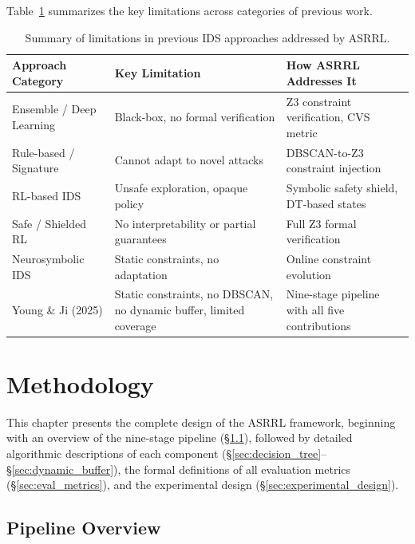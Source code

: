 \documentclass[12pt, letterpaper, oneside]{report}
\newcommand{\ASRRL}{\textsc{ASRRL}}
\begin{document}
Table~\ref{tab:prior_limitations} summarizes the key limitations across categories of previous work.

\begin{table}[htbp]
\centering
\caption{Summary of limitations in previous IDS approaches addressed by \ASRRL{}.}
\label{tab:prior_limitations}
\small
\begin{tabular}{p{3.5cm}p{4cm}p{4cm}}
\toprule
\textbf{Approach Category} & \textbf{Key Limitation} & \textbf{How \ASRRL{} Addresses It} \\
\midrule
Ensemble / Deep Learning & Black-box, no formal verification & Z3 constraint verification, CVS metric \\
Rule-based / Signature & Cannot adapt to novel attacks & DBSCAN-to-Z3 constraint injection \\
RL-based IDS & Unsafe exploration, opaque policy & Symbolic safety shield, DT-based states \\
Safe / Shielded RL & No interpretability or partial guarantees & Full Z3 formal verification \\
Neurosymbolic IDS & Static constraints, no adaptation & Online constraint evolution \\
Young \& Ji (2025) & Static constraints, no DBSCAN, no dynamic buffer, limited coverage & Nine-stage pipeline with all five contributions \\
\bottomrule
\end{tabular}
\end{table}



\chapter{Methodology}
\label{ch:methodology}

This chapter presents the complete design of the \ASRRL{} framework, beginning with an overview of the nine-stage pipeline (\S\ref{sec:pipeline_overview}), followed by detailed algorithmic descriptions of each component (\S\ref{sec:decision_tree}--\S\ref{sec:dynamic_buffer}), the formal definitions of all evaluation metrics (\S\ref{sec:eval_metrics}), and the experimental design (\S\ref{sec:experimental_design}).


\section{Pipeline Overview}
\label{sec:pipeline_overview}
\end{document}
